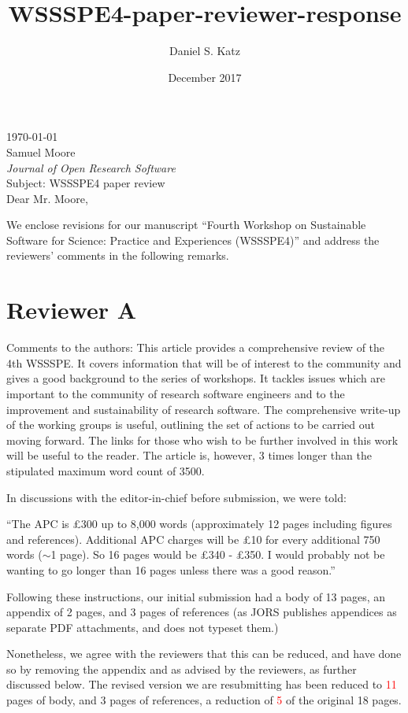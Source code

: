 \documentclass[11pt]{article}
\title{WSSSPE4-paper-reviewer-response}
\author{Daniel S. Katz}
\date{December 2017}
\begin{document}
\today\\

Samuel Moore\\
\textit{Journal of Open Research Software}\\

Subject: WSSSPE4 paper review\\

Dear Mr. Moore,

We enclose revisions for our manuscript ``Fourth Workshop on Sustainable Software for Science: Practice and Experiences
(WSSSPE4)'' and address the reviewers' comments in the following remarks.


\section*{Reviewer A}

\begin{quoting}
Comments to the authors: 
This article provides a comprehensive review of the 4th WSSSPE.  It covers information that will be of interest to the community and gives a good background to the series of workshops.  It tackles issues which are important to the community of research software engineers and to the improvement and sustainability of research software.
The comprehensive write-up of the working groups is useful, outlining the set of actions to be carried out moving forward. The links for those who wish to be further involved in this work will be useful to the reader.
The article is, however, 3 times longer than the stipulated maximum word count of 3500. 
\end{quoting}

In discussions with the editor-in-chief before submission, we were told:

``The APC is \pounds300 up to 8,000 words (approximately 12 pages including
figures and references). Additional APC charges will be \pounds10 for every
additional 750 words ($\sim$1 page).
So 16 pages would be \pounds340 - \pounds350. I would probably not be wanting to
go longer than 16 pages unless there was a good reason.''

Following these instructions, our initial submission had a body of 13 pages, an appendix of 2 pages, and 3 pages of references (as JORS publishes appendices as separate PDF attachments, and does not typeset them.)

Nonetheless, we agree with the reviewers that this can be reduced, and have done so by removing the appendix and as advised by the reviewers, as further discussed below.  The revised version we are resubmitting has been reduced to \textcolor{red}{11} pages of body, and 3 pages of references, a reduction of \textcolor{red}{5} of the original 18 pages.
\end{document}
